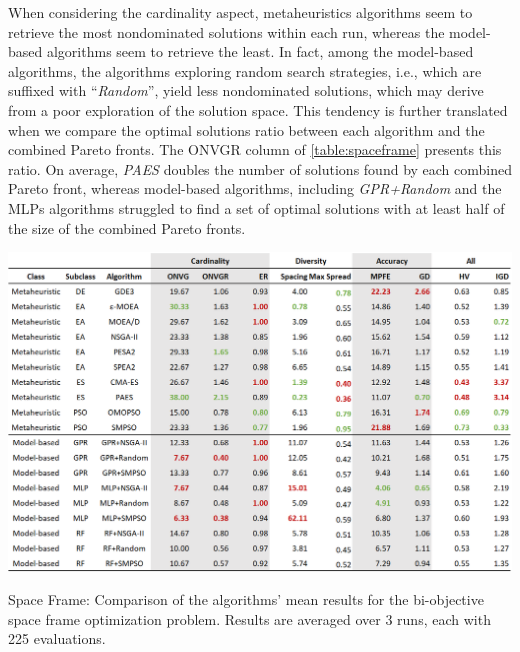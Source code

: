 When considering the cardinality aspect, metaheuristics algorithms seem to retrieve the most nondominated solutions within each run, whereas the model-based algorithms seem to retrieve the least. In fact, among the model-based algorithms, the algorithms exploring random search strategies, i.e., which are suffixed with ``\textit{Random}'', yield less nondominated solutions, which may derive from a poor exploration of the solution space. This tendency is further translated when we compare the optimal solutions ratio between each algorithm and the combined Pareto fronts. The \ac{ONVGR} column of \cref{table:spaceframe} presents this ratio. On average, \textit{PAES} doubles the number of solutions found by each combined Pareto front, whereas model-based algorithms, including \textit{GPR+Random} and the \acp{MLP} algorithms struggled to find a set of optimal solutions with at least half of the size of the combined Pareto fronts. 

\begin{table}[h!]
	\centering
	\includegraphics[width=\textwidth]{Images/Evaluation/caadria/Results_Mean_20190416.PNG}
	\caption[Space Frame: Mean performance values of the algorithms' results]{Space Frame: Comparison of the algorithms' mean results for the bi-objective space frame optimization problem. Results are averaged over 3 runs, each with 225 evaluations.}
	\label{table:spaceframe}
\end{table}

